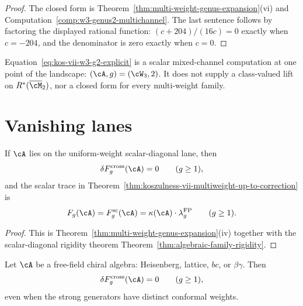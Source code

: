 \begin{proof}
The closed form is Theorem~\textup{\ref{thm:multi-weight-genus-expansion}}\textup{(vi)}
and Computation~\textup{\ref{comp:w3-genus2-multichannel}}. The last
sentence follows by factoring the displayed rational function:
$(c+204)/(16c)=0$ exactly when $c=-204$, and the denominator is zero
exactly when $c=0$.
\end{proof}

\begin{remark}
\label{rem:kos-vii-w3-g2-anchor}
Equation~\textup{\ref{eq:kos-vii-w3-g2-explicit}} is a scalar
mixed-channel computation at one point of the landscape:
$(\cA,g)=(\cW_3,2)$. It does not supply a class-valued lift on
$R^*(\overline{\cM}_2)$, nor a closed form for every multi-weight
family.
\end{remark}

\section{Vanishing lanes}
\label{sec:kos-vii-corollaries}

\begin{corollary}
\label{cor:uniform-weight-correction-vanishes}
If $\cA$ lies on the uniform-weight scalar-diagonal lane, then
\[
\delta F_g^{\mathrm{cross}}(\cA)=0
\qquad(g\geq 1),
\]
and the scalar trace in Theorem~\textup{\ref{thm:koszulness-vii-multiweight-up-to-correction}}
is
\[
F_g(\cA)=F_g^{\mathrm{sc}}(\cA)
=\kappa(\cA)\cdot\lambda_g^{\mathrm{FP}}
\qquad(g\geq 1).
\]
\end{corollary}

\begin{proof}
This is Theorem~\textup{\ref{thm:multi-weight-genus-expansion}}\textup{(iv)}
together with the scalar-diagonal rigidity theorem
Theorem~\textup{\ref{thm:algebraic-family-rigidity}}.
\end{proof}

\begin{corollary}
\label{cor:free-field-correction-vanishes}
Let $\cA$ be a free-field chiral algebra: Heisenberg, lattice, $bc$, or
$\beta\gamma$. Then
\[
\delta F_g^{\mathrm{cross}}(\cA)=0
\qquad(g\geq 1),
\]
even when the strong generators have distinct conformal weights.
\end{corollary}


